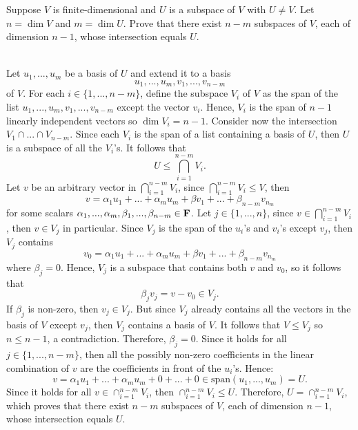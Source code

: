 \begin{exercise}
    Suppose $V$ is finite-dimensional and $U$ is a subspace of $V$ with $U \neq V$. Let $n = \dim V$ and $m = \dim U$. Prove that there exist $n-m$ subspaces of $V$, each of dimension $n-1$, whose intersection equals $U$. \\
\end{exercise}

\begin{solution}
    \\ Let $u_1, ..., u_m$ be a basis of $U$ and extend it to a basis
    $$u_1, ..., u_m, v_1, ..., v_{n-m}$$
    of $V$. For each $i \in \{1, ..., n-m\}$, define the subspace $V_i$ of $V$ as the span of the list $u_1, ..., u_m, v_1, ..., v_{n-m}$ except the vector $v_i$. Hence, $V_i$ is the span of $n - 1$ linearly independent vectors so $\dim V_i = n-1$. Consider now the intersection $V_1 \cap ... \cap V_{n-m}$. Since each $V_i$ is the span of a list containing a basis of $U$, then $U$ is a subspace of all the $V_i$'s. It follows that
    $$U \leq \bigcap_{i=1}^{n-m}V_i.$$
    Let $v$ be an arbitrary vector in $\bigcap_{i=1}^{n-m}V_i$, since $\bigcap_{i=1}^{n-m}V_i \leq V$, then
    $$v = \alpha_1 u_1 + ... + \alpha_m u_m + \beta v_1 + ... + \beta_{n-m} v_{n_m}$$
    for some scalars $\alpha_1, ..., \alpha_m, \beta_1, ..., \beta_{n-m} \in \mathbf{F}$. Let $j \in \{1, ..., n\}$, since $v \in \bigcap_{i=1}^{n-m}V_i$, then $v \in V_j$ in particular. Since $V_j$ is the span of the $u_i$'s and $v_i$'s except $v_j$, then $V_j$ contains
    $$v_0 = \alpha_1 u_1 + ... + \alpha_m u_m + \beta v_1 + ... + \beta_{n-m} v_{n_m}$$
    where $\beta_j = 0$. Hence, $V_j$ is a subspace that contains both $v$ and $v_0$, so it follows that
    $$\beta_j v_j = v - v_0 \in V_j.$$
    If $\beta_j$ is non-zero, then $v_j \in V_j$. But since $V_j$ already contains all the vectors in the basis of $V$ except $v_j$, then $V_j$ contains a basis of $V$. It follows that $V \leq V_j$ so $n \leq n - 1$, a contradiction. Therefore, $\beta_j = 0$. Since it holds for all $j \in \{1, ..., n-m\}$, then all the possibly non-zero coefficients in the linear combination of $v$ are the coefficients in front of the $u_i$'s. Hence:
    $$v = \alpha_1 u_1 + ... + \alpha_m u_m + 0  + ... + 0 \in \text{span}(u_1, ..., u_m) = U.$$
    Since it holds for all $v \in \cap_{i=1}^{n-m}V_i$, then $\cap_{i=1}^{n-m}V_i \leq U$. Therefore, $U = \cap_{i=1}^{n-m}V_i$, which proves that there exist $n-m$ subspaces of $V$, each of dimension $n-1$, whose intersection equals $U$. \\
\end{solution}


